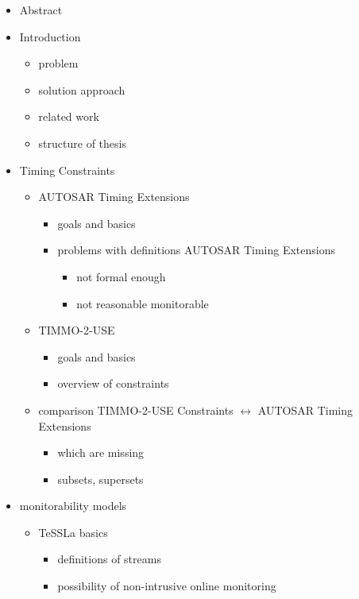 \documentclass[]{article}
\begin{document}
\begin{itemize}
	\item
		Abstract
	\item
		Introduction
		\begin{itemize}
			\item
				problem
			\item
				solution approach
			\item
				related work
			\item
				structure of thesis
		\end{itemize}
	\item
		Timing Constraints
		\begin{itemize}
			\item
				AUTOSAR Timing Extensions
				\begin{itemize}
					\item
						goals and basics
					\item
						problems with definitions AUTOSAR Timing Extensions
						\begin{itemize}
							\item
								not formal enough
							\item
								not reasonable monitorable
						\end{itemize}
				\end{itemize}
			\item
				TIMMO-2-USE
				\begin{itemize}
					\item
						goals and basics
					\item
						overview of constraints
				\end{itemize}
			\item
				comparison TIMMO-2-USE Constraints $\leftrightarrow$ AUTOSAR Timing Extensions
				\begin{itemize}
					\item
						which are missing
					\item
						subsets, supersets
				\end{itemize}
		\end{itemize}
	\item
		monitorability models
		\begin{itemize}
			\item
				TeSSLa basics
				\begin{itemize}
					\item
						definitions of streams
					\item
						possibility of non-intrusive online monitoring
				\end{itemize}

\end{itemize}
\end{itemize}
\end{document}
